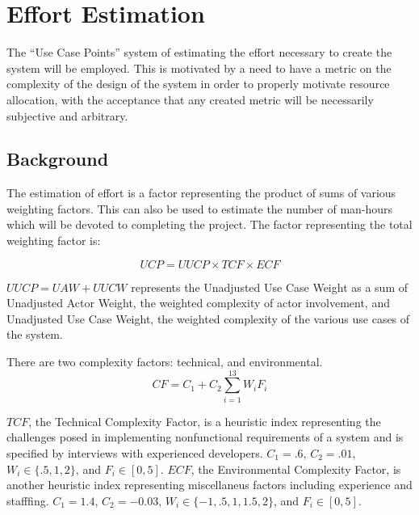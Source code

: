 \chapter{Effort Estimation}
\newcommand{\UCP}{\mathit{UCP}}
\newcommand{\UUCP}{\mathit{UUCP}}
\newcommand{\TCF}{\mathit{TCF}}
\newcommand{\ECF}{\mathit{ECF}}
\newcommand{\UAW}{\mathit{UAW}}
\newcommand{\UUCW}{\mathit{UUCW}}
\newcommand{\CF}{\mathit{CF}}
\newcommand{\PF}{\mathit{PF}}

The ``Use Case Points'' system of estimating the effort necessary 
to create the system will be employed. This is motivated by
a need to have a metric on the complexity of the design of
the system in order to properly motivate resource allocation,
with the acceptance that any created metric will be necessarily
subjective and arbitrary.

\section{Background}

The estimation of effort is a factor representing the product of sums
of various weighting factors. This can also be used to estimate the 
number of man-hours which will be devoted to completing the project.
The factor representing the total weighting factor is:

\begin{equation}
\UCP = \UUCP \times \TCF \times \ECF
\end{equation}

$\UUCP = \UAW + \UUCW$ represents the Unadjusted Use Case Weight as a
sum of Unadjusted Actor Weight, the weighted complexity of actor
involvement, and Unadjusted Use Case Weight, the weighted complexity
of the various use cases of the system. 

There are two complexity factors: technical, and environmental.
\begin{equation}
\CF = C_1+C_2\sum_{i=1}^{13}W_iF_i
\end{equation}

$\TCF$, the Technical Complexity Factor, is a heuristic index
representing the challenges posed in implementing nonfunctional
requirements of a system and is
specified by interviews with experienced developers. $C_1 = .6$, 
$C_2 = .01$, $W_i \in \{.5, 1, 2\} $, and $F_i \in [0,5]$. $ECF$,
the Environmental Complexity Factor, is another heuristic index
representing miscellaneus factors including experience and stafffing.
$C_1 = 1.4$, $C_2 = -0.03$, $W_i \in \{-1,.5,1,1.5,2\}$, and 
$F_i \in [0,5]$. 

